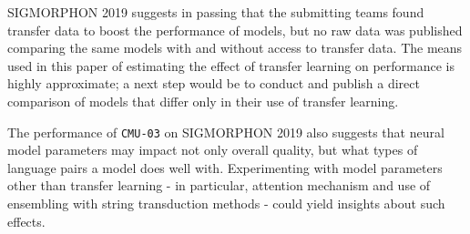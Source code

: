 SIGMORPHON 2019 suggests in passing that the submitting teams found transfer data to boost the performance of models, but no raw data was published comparing the same models with and without access to transfer data. The means used in this paper of estimating the effect of transfer learning on performance is highly approximate; a next step would be to conduct and publish a direct comparison of models that differ only in their use of transfer learning.

The performance of \texttt{CMU-03} on SIGMORPHON 2019 also suggests that neural model parameters may impact not only overall quality, but what types of language pairs a model does well with. Experimenting with model parameters other than transfer learning - in particular, attention mechanism and use of ensembling with string transduction methods - could yield insights about such effects.